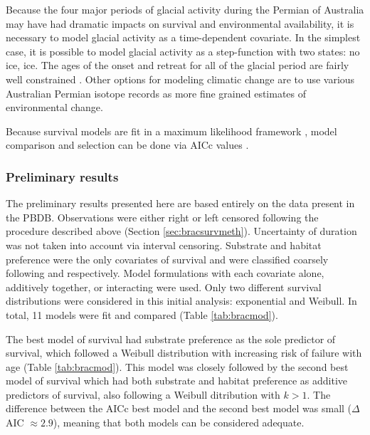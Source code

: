 \documentclass[12pt,letterpaper]{article}
\begin{document}
Because the four major periods of glacial activity during the Permian of Australia may have had dramatic impacts on survival and environmental availability, it is necessary to model glacial activity as a time-dependent covariate. In the simplest case, it is possible to model glacial activity as a step-function with two states: no ice, ice. The ages of the onset and retreat for all of the glacial period are fairly well constrained \citep{Fielding2008,Fielding2008a}. Other options for modeling climatic change are to use various Australian Permian isotope records \citep{Birgenheier2010} as more fine grained estimates of environmental change. 

Because survival models are fit in a maximum likelihood framework \citep{Kleinbaum2005}, model comparison and selection can be done via AICc values \citep{Hurvich1989,Burnham2002a}.


\subsubsection{Preliminary results} \label{sec:bracsurvres}
The preliminary results presented here are based entirely on the data present in the PBDB. Observations were either right or left censored following the procedure described above (Section \ref{sec:bracsurvmeth}). Uncertainty of duration was not taken into account via interval censoring. Substrate and habitat preference were the only covariates of survival and were classified coarsely following \citet{Foote2006} and \citet{Kiessling2007} respectively. Model formulations with each covariate alone, additively together, or interacting were used. Only two different survival distributions were considered in this initial analysis: exponential and Weibull. In total, 11 models were fit and compared (Table \ref{tab:bracmod}). 

The best model of survival had substrate preference as the sole predictor of survival, which followed a Weibull distribution with increasing risk of failure with age (Table \ref{tab:bracmod}). This model was closely followed by the second best model of survival which had both substrate and habitat preference as additive predictors of survival, also following a Weibull ditribution with \(k > 1\). The difference between the AICc best model and the second best model was small (\(\Delta\) AIC \(\approx 2.9\)), meaning that both models can be considered adequate. 
\end{document}
